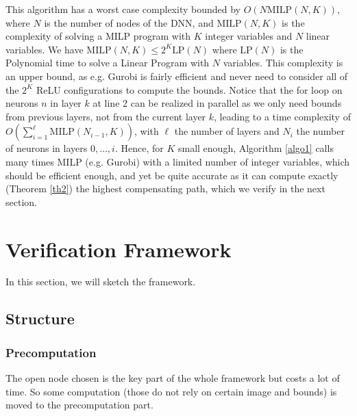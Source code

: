 \documentclass{llncs}
\newcommand{\MILP}{{\textrm{MILP}}}
\newcommand{\LP}{{\textrm{LP}}}
\begin{document}
This algorithm has a worst case complexity bounded by $O(N \MILP(N,K))$, 
where $N$ is the number of nodes of the DNN, 
and $\MILP(N,K)$ is the complexity of solving a MILP program with $K$ integer variables and $N$ linear variables.
We have $\MILP(N,K) \leq 2^K \LP(N)$ where $\LP(N)$ is the Polynomial time to solve a Linear Program with $N$ variables.
This complexity is an upper bound, as e.g. Gurobi is fairly efficient and never need to consider all of the $2^K$ ReLU configurations to compute the bounds.
Notice that the for loop on neurons $n$ in layer $k$ at line 2 can be realized in parallel as we only need bounds from previous layers, not from the current layer $k$, 
leading to a time complexity of $O(\sum_{i=1}^{\ell} \MILP(N_{i-1},K))$, with $\ell$ the number of layers and $N_i$ the number of neurons in layers $0, \ldots, i$.
Hence, for $K$ small enough, Algorithm \ref{algo1} calls many times MILP (e.g. Gurobi)
with a limited number of integer variables, which should be efficient enough, and yet be quite accurate as it can compute exactly (Theorem \ref{th2}) the highest compensating path, which we verify in the next section.





\iffalse
\section{Verification Framework}




In this section, we will sketch the framework. 

\subsection{Structure}

\subsubsection*{Precomputation}

The open node chosen is the key part of the whole framework but costs a lot of time. So some computation (those do not rely on certain image and bounds) is moved to the precomputation part.

%
\end{document}
